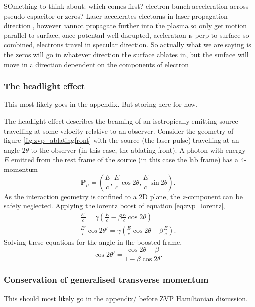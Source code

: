 SOmething to think about: which comes first? electron bunch acceleration across pseudo capacitor or zeros?
Laser accelerates electorns in laser propagation direction , however cannot propagate further into the plasma so only get motion parallel to surface, once potentail well disrupted, accleration is perp to surface so combined, electrons travel in specular direction.
So actually what we are saying is the zeros will go in whatever direction the surface ablates in, but the surface will move in a direction dependent on the components of electron 


\subsubsection{The headlight effect}\label{sec:zvp_headlight}
This most likely goes in the appendix. But storing here for now.

The headlight effect describes the beaming of an isotropically emitting source travelling at some velocity relative to an observer. Consider the geometry of figure \ref{fig:zvp_ablatingfront} with the source (the laser pulse) travelling at an angle $2\theta$ to the observer (in this case, the ablating front). A photon with energy $E$ emitted from the rest frame of the source (in this case the lab frame) has a 4-momentum
\begin{equation}
	\mathbf{P}_\mu = \left(\frac{E}{c},\frac{E}{c}\cos{2\theta},\frac{E}{c}\sin{2\theta}\right).
\end{equation}
As the interaction geometry is confined to a 2D plane,  the $z$-component can be safely neglected. Applying the lorentz boost of equation \ref{eq:zvp_lorentz},
\begin{equation}
	\begin{split}
		\frac{E'}{c} = \gamma \left( \frac{E}{c} - \beta \frac{E}{c}\cos{2\theta}\right) \\
		\frac{E'}{c}\cos{2\theta'} = \gamma \left( \frac{E}{c}\cos{2\theta} - \beta \frac{E}{c}\right).
	\end{split}
\end{equation}
Solving these equations for the angle in the boosted frame,
\begin{equation}
	\cos{2\theta'} = \frac{\cos{2\theta} - \beta}{1-\beta\cos{2\theta}}.
\end{equation}

\subsubsection{Conservation of generalised transverse momentum}\label{sec_app_conservation-generalised-mometum}
This should most likely go in the appendix/ before ZVP Hamiltonian discussion.

